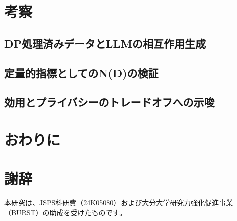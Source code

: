 \documentclass{my_bthesis}
\begin{document}
\chapter{考察}


\section{DP処理済みデータとLLMの相互作用生成}


\section{定量的指標としてのN(D)の検証}




\section{効用とプライバシーのトレードオフへの示唆}










\chapter{おわりに}



\chapter*{謝辞}
本研究は、JSPS科研費（24K05080）および大分大学研究力強化促進事業（BURST）の助成を受けたものです。





\end{document}
